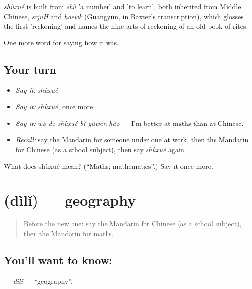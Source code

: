 \begin{cousinweb}
\emph{shùxué} is built from \emph{shù} 'a number' and  'to learn', both inherited from Middle Chinese, \emph{srjuH} and \emph{haewk} (Guangyun, in Baxter's transcription), which glosses the first 'reckoning' and names the nine arts of reckoning of an old book of rites.
\end{cousinweb}

\begin{grammarlens}[title={What you've built}]
One more word for saying how it was.
\end{grammarlens}

\subsection*{Your turn}
\begin{itemize}
\raggedright
  \item \emph{Say it:} \emph{shùxué}
  \item \emph{Say it:} \emph{shùxué}, once more
  \item \emph{Say it:} \emph{wǒ de shùxué bǐ yǔwén hǎo} — I'm better at maths than at Chinese.
  \item \emph{Recall:} say the Mandarin for someone under one at work, then the Mandarin for Chinese (as a school subject), then say \emph{shùxué} again
\end{itemize}

\begin{tcolorbox}[breakable,colback=teal!4,colframe=teal!35!black,title={Before you move on}]
What does shùxué mean? (\textquotedblleft{}Maths; mathematics\textquotedblright{}.) Say it once more.
\end{tcolorbox}
\section[\texorpdfstring{\zh{地理} (dìlǐ)}{地理 (dìlǐ)}]{ (dìlǐ) — geography}

\label{lesson:ZH-C492-dili}



\begin{quote}
Before the new one: say the Mandarin for Chinese (as a school subject), then the Mandarin for maths.
\end{quote}

\subsection*{You'll want to know: }
\textbf{} — \emph{dìlǐ} — \textquotedblleft{}geography\textquotedblright{}.

